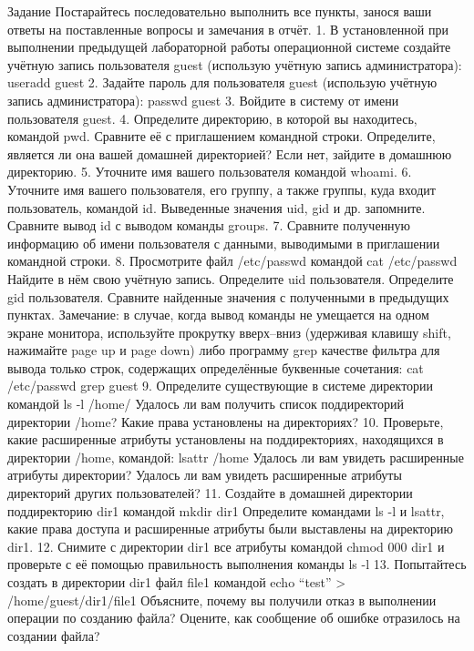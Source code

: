 \documentclass[
  ignorenonframetext,
  aspectratio=169,
  russian,
]{beamer}
\begin{document}
\begin{frame}{Задание}
Постарайтесь последовательно выполнить все пункты, занося ваши ответы на
поставленные вопросы и замечания в отчёт. 1. В установленной при
выполнении предыдущей лабораторной работы операционной системе создайте
учётную запись пользователя guest (использую учётную запись
администратора): useradd guest 2. Задайте пароль для пользователя guest
(использую учётную запись администратора): passwd guest 3. Войдите в
систему от имени пользователя guest. 4. Определите директорию, в которой
вы находитесь, командой pwd. Сравните её с приглашением командной
строки. Определите, является ли она вашей домашней директорией? Если
нет, зайдите в домашнюю директорию. 5. Уточните имя вашего пользователя
командой whoami. 6. Уточните имя вашего пользователя, его группу, а
также группы, куда входит пользователь, командой id. Выведенные значения
uid, gid и др. запомните. Сравните вывод id с выводом команды groups. 7.
Сравните полученную информацию об имени пользователя с данными,
выводимыми в приглашении командной строки. 8. Просмотрите файл
/etc/passwd командой cat /etc/passwd Найдите в нём свою учётную запись.
Определите uid пользователя. Определите gid пользователя. Сравните
найденные значения с полученными в предыдущих пунктах. Замечание: в
случае, когда вывод команды не умещается на одном экране монитора,
используйте прокрутку вверх--вниз (удерживая клавишу shift, нажимайте
page up и page down) либо программу grep качестве фильтра для вывода
только строк, содержащих определённые буквенные сочетания: cat
/etc/passwd \textbar{} grep guest 9. Определите существующие в системе
директории командой ls -l /home/ Удалось ли вам получить список
поддиректорий директории /home? Какие права установлены на директориях?
10. Проверьте, какие расширенные атрибуты установлены на поддиректориях,
находящихся в директории /home, командой: lsattr /home Удалось ли вам
увидеть расширенные атрибуты директории? Удалось ли вам увидеть
расширенные атрибуты директорий других пользователей? 11. Создайте в
домашней директории поддиректорию dir1 командой mkdir dir1 Определите
командами ls -l и lsattr, какие права доступа и расширенные атрибуты
были выставлены на директорию dir1. 12. Снимите с директории dir1 все
атрибуты командой chmod 000 dir1 и проверьте с её помощью правильность
выполнения команды ls -l 13. Попытайтесь создать в директории dir1 файл
file1 командой echo \enquote{test} \textgreater{} /home/guest/dir1/file1
Объясните, почему вы получили отказ в выполнении операции по созданию
файла? Оцените, как сообщение об ошибке отразилось на создании файла?

\end{frame}
\end{document}
